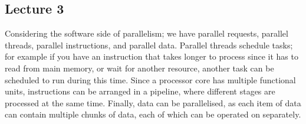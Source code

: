 \documentclass[a4paper, 12pt]{article}
\begin{document}
        \subsection*{Lecture 3}
            Considering the software side of parallelism; we have parallel requests, parallel threads, parallel instructions, and parallel data. Parallel threads schedule tasks; for example if you have an instruction that takes longer to process since it has to read from main memory, or wait for another resource, another task can be scheduled to run during this time. Since a processor core has multiple functional units, instructions can be arranged in a pipeline, where different stages are processed at the same time. Finally, data can be parallelised, as each item of data can contain multiple chunks of data, each of which can be operated on separately.
            \medskip
\end{document}

